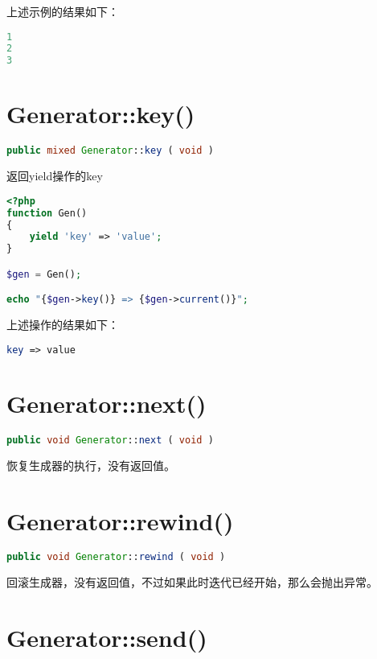 上述示例的结果如下：

\begin{lstlisting}[language=PHP]
1
2
3
\end{lstlisting}

\section{Generator::key()}



\begin{lstlisting}[language=PHP]
public mixed Generator::key ( void )
\end{lstlisting}

返回yield操作的key

\begin{lstlisting}[language=PHP]
<?php
function Gen()
{
    yield 'key' => 'value';
}

$gen = Gen();

echo "{$gen->key()} => {$gen->current()}";
\end{lstlisting}

上述操作的结果如下：

\begin{lstlisting}[language=PHP]
key => value
\end{lstlisting}


\section{Generator::next()}




\begin{lstlisting}[language=PHP]
public void Generator::next ( void )
\end{lstlisting}

恢复生成器的执行，没有返回值。

\section{Generator::rewind()}



\begin{lstlisting}[language=PHP]
public void Generator::rewind ( void )
\end{lstlisting}

回滚生成器，没有返回值，不过如果此时迭代已经开始，那么会抛出异常。


\section{Generator::send()}


